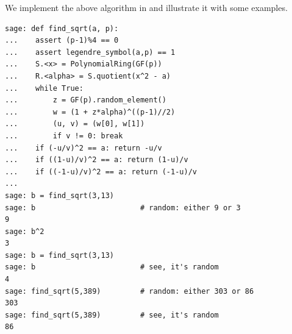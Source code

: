 \begin{sg}
We implement the above algorithm in \sage and illustrate it
with some examples.
\begin{verbatim}
sage: def find_sqrt(a, p):
...    assert (p-1)%4 == 0
...    assert legendre_symbol(a,p) == 1
...    S.<x> = PolynomialRing(GF(p))
...    R.<alpha> = S.quotient(x^2 - a)
...    while True:
...        z = GF(p).random_element()
...        w = (1 + z*alpha)^((p-1)//2)
...        (u, v) = (w[0], w[1])
...        if v != 0: break
...    if (-u/v)^2 == a: return -u/v
...    if ((1-u)/v)^2 == a: return (1-u)/v
...    if ((-1-u)/v)^2 == a: return (-1-u)/v
...
sage: b = find_sqrt(3,13)
sage: b                        # random: either 9 or 3
9
sage: b^2
3
sage: b = find_sqrt(3,13)
sage: b                        # see, it's random
4
sage: find_sqrt(5,389)         # random: either 303 or 86
303
sage: find_sqrt(5,389)         # see, it's random
86
\end{verbatim}
\end{sg}









